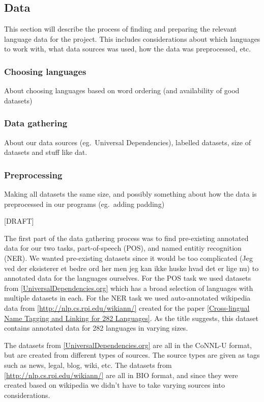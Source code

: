 

\subsection{Data}

This section will describe the process of finding and preparing the relevant
language data for the project. This includes considerations about which
languages to work with, what data sources was used, how the data was
preprocessed, etc.


\subsubsection{Choosing languages}

About choosing languages based on word ordering (and availability of good
datasets)


\subsubsection{Data gathering}

About our data sources (eg.\ Universal Dependencies), labelled datasets, size of
datasets and stuff like dat.


\subsubsection{Preprocessing}

Making all datasets the same size, and possibly something about how the data is
preprocessed in our programs (eg.\ adding padding)


[DRAFT]

The first part of the data gathering process was to find pre-existing annotated data for our two tasks, part-of-speech (POS), and named entitiy recognition (NER).
We wanted pre-existing datasets since it would be {too complicated (Jeg ved der eksisterer et bedre ord her men jeg kan ikke huske hvad det er lige nu)} to annotated data for the languages ourselves.
For the POS task we used datasets from \ref{UniversalDependencies.org} which has a broad selection of languages with multiple datasets in each.
For the NER task we used auto-annotated wikipedia data from \ref{http://nlp.cs.rpi.edu/wikiann/} created for the paper \ref{Cross-lingual Name Tagging and Linking for 282 Languages}.
As the title suggests, this dataset contains annotated data for 282 languages in varying sizes.

The datasets from \ref{UniversalDependencies.org} are all in the CoNNL-U format, but are created from different types of sources. 
The source types are given as tags such as news, legal, blog, wiki, etc.
The datasets from \ref{http://nlp.cs.rpi.edu/wikiann/} are all in BIO format, and since they were created based on wikipedia we didn't have to take varying sources into considerations.

